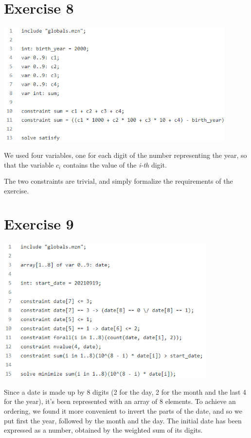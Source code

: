 \documentclass{article}
\begin{document}
\section{Exercise 8}
\vspace{0.2cm}
\includegraphics[width=12cm]{img/Es8.png}
\vspace{0.2cm}

We used four variables, one for each digit of the number representing the year, so that the variable
\textit{$c_i$} contains the value of the \textit{i-th} digit. 

The two constraints are trivial, and simply formalize the requirements of the exercise.

\section{Exercise 9}
\vspace{0.2cm}
\includegraphics[width=11cm]{img/Es9.png}
\vspace{0.2cm}

Since a date is made up by 8 digits (2 for the day, 2 for the month and the last 4 for the year),
it's been represented with an array of 8 elements. To achieve an ordering, we found it more convenient
to invert the parts of the date, and so we put first the year, followed by the month and the day.
The initial date has been expressed as a number, obtained by the weighted sum of its digits.
\end{document}
